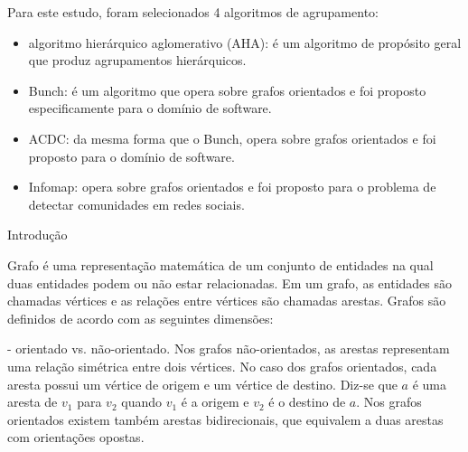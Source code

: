 
Para este estudo, foram selecionados 4 algoritmos de agrupamento: 

\begin{itemize}
	\item algoritmo hierárquico aglomerativo (AHA): é um algoritmo de propósito geral que produz agrupamentos hierárquicos.
	\item Bunch: é um algoritmo que opera sobre grafos orientados e foi proposto especificamente para o domínio de software.
	\item ACDC: da mesma forma que o Bunch, opera sobre grafos orientados e foi proposto para o domínio de software.
	\item Infomap: opera sobre grafos orientados e foi proposto para o problema de detectar comunidades em redes sociais.
\end{itemize}






\begin{section}{Introdução}
	
\end{section}


Grafo é uma representação matemática de um conjunto de entidades na qual duas entidades podem ou não estar relacionadas. Em um grafo, as entidades são chamadas vértices e as relações entre vértices são chamadas arestas. Grafos são definidos de acordo com as seguintes dimensões:

- orientado vs. não-orientado. Nos grafos não-orientados, as arestas representam uma relação simétrica entre dois vértices. No caso dos grafos orientados, cada aresta possui um vértice de origem e um vértice de destino. Diz-se que $a$ é uma aresta de $v_1$ para $v_2$ quando $v_1$ é a origem e $v_2$ é o destino de $a$. Nos grafos orientados existem também arestas bidirecionais, que equivalem a duas arestas com orientações opostas.

